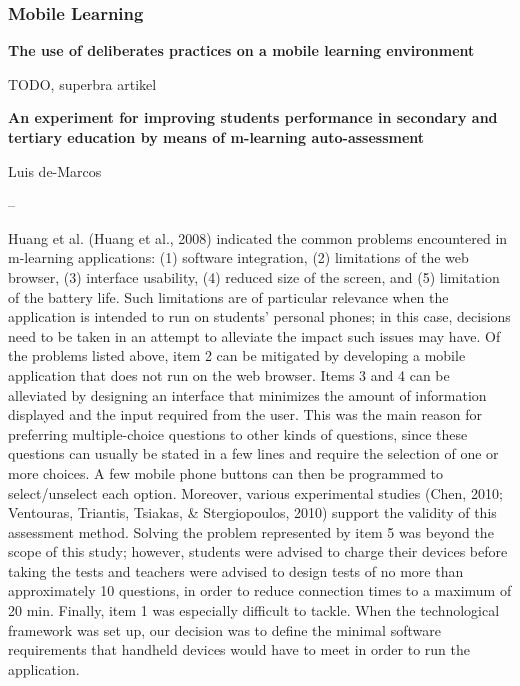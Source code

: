 \subsubsection{Mobile Learning}

\textbf{The use of deliberates practices on a mobile learning environment}

TODO, superbra artikel

\textbf{An experiment for improving students performance in secondary and tertiary education by means of m-learning auto-assessment}

Luis de-Marcos


--

Huang et al. (Huang et al., 2008) indicated the common problems encountered in m-learning applications: (1) software integration, (2)
limitations of the web browser, (3) interface usability, (4) reduced size of the screen, and (5) limitation of the battery life. Such limitations are
of particular relevance when the application is intended to run on students’ personal phones; in this case, decisions need to be taken in an
attempt to alleviate the impact such issues may have. Of the problems listed above, item 2 can be mitigated by developing a mobile
application that does not run on the web browser. Items 3 and 4 can be alleviated by designing an interface that minimizes the amount of
information displayed and the input required from the user. This was the main reason for preferring multiple-choice questions to other
kinds of questions, since these questions can usually be stated in a few lines and require the selection of one or more choices. A few mobile
phone buttons can then be programmed to select/unselect each option. Moreover, various experimental studies (Chen, 2010; Ventouras,
Triantis, Tsiakas, \& Stergiopoulos, 2010) support the validity of this assessment method. Solving the problem represented by item 5 was
beyond the scope of this study; however, students were advised to charge their devices before taking the tests and teachers were advised to
design tests of no more than approximately 10 questions, in order to reduce connection times to a maximum of 20 min. Finally, item 1 was
especially difficult to tackle. When the technological framework was set up, our decision was to define the minimal software requirements
that handheld devices would have to meet in order to run the application.